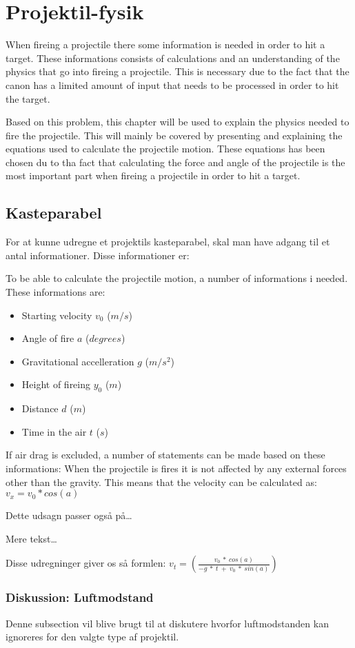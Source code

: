 \chapter{Projektil-fysik}
When fireing a projectile there some information is needed in order to hit a
target. These informations consists of calculations and an understanding of the
physics that go into fireing a projectile. This is necessary due to the fact
that the canon has a limited amount of input that needs to be processed in order
to hit the target.

Based on this problem, this chapter will be used to explain the physics needed
to fire the projectile. This will mainly be covered by presenting and explaining
the equations used to calculate the projectile motion. These equations has been
chosen du to tha fact that calculating the force and angle of the projectile is
the most important part when fireing a projectile in order to hit a target.\nl


\section{Kasteparabel}
For at kunne udregne et projektils kasteparabel, skal man have adgang til et
antal informationer. Disse informationer er:

To be able to calculate the projectile motion, a number of informations i
needed. These informations are:
\begin{itemize}
  \item Starting velocity $v_0$ ($m/s$)
  \item Angle of fire $a$ ($degrees$)
  \item Gravitational accelleration $g$ ($m/s^2$)
  \item Height of fireing $y_0$ ($m$)
  \item Distance $d$ ($m$)
  \item Time in the air $t$ ($s$)
\end{itemize}

If air drag is excluded, a number of statements can be made based on these
informations:\nl
When the projectile is fires it is not affected by any external forces other
than the gravity. This means that the velocity can be calculated as:
$v_x = v_0 * cos(a)$\nl

Dette udsagn passer også på\ldots \nl

Mere tekst\ldots \nl

Disse udregninger giver os så formlen:\nl
$v_t = (\frac{v_0\ *\ cos(a)}{-g\ *\ t\ +\ v_0\ *\ sin(a)})$

\subsection{Diskussion: Luftmodstand}
Denne subsection vil blive brugt til at diskutere hvorfor luftmodstanden kan
ignoreres for den valgte type af projektil.

